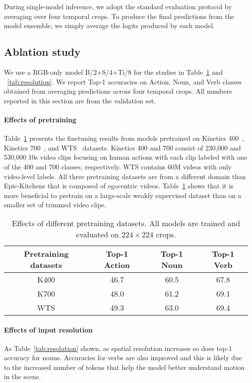 During single-model inference, we adopt the standard evaluation protocol by averaging over four temporal crops. To produce the final predictions from the model ensemble, we simply average the logits produced by each model.

\subsection{Ablation study} 
\label{sec:ablations}
We use a RGB-only model B/2+S/4+Ti/8 for the studies in Table~\ref{tab:pretraining} and ~\ref{tab:resolution}. We report Top-1 accuracies on Action, Noun, and Verb classes obtained from averaging predictions across four temporal crops. All numbers reported in this section are from the validation set.

\paragraph{Effects of pretraining}
Table~\ref{tab:pretraining} presents the finetuning results from models pretrained on Kinetics 400~\cite{kay_arxiv_2017}, Kinetics 700~\cite{kay_arxiv_2017}, and WTS~\cite{stroud2020learning} datasets. Kinetics 400 and 700 consist of 230,000 and 530,000 10s video clips focusing on human actions with each clip labeled with one of the 400 and 700 classes, respectively. WTS contains 60M videos with only video-level labels. All three pretraining datasets are from a different domain than Epic-Kitchens that is composed of egocentric videos. Table~\ref{tab:pretraining} shows that it is more beneficial to pretrain on a large-scale weakly supervised dataset than on a smaller set of trimmed video clips.
\begin{table} 
	\centering
	\scriptsize{
\begin{tabular}{  c  c  c  c }
    \toprule
    Pretraining datasets & Top-1 Action & Top-1 Noun & Top-1 Verb \\
    \midrule
    K400 & 46.7 & 60.5 & 67.8 \\
    K700 & 48.0 & 61.2 & 69.1 \\
    WTS & 49.3 & 63.0 & 69.4 \\
    \bottomrule
   \end{tabular}
   }
	\caption{Effects of different pretraining datasets. All models are trained and evaluated on $224\times224$ crops.}
\label{tab:pretraining}
\end{table}
 
\paragraph{Effects of input resolution}
As Table~\ref{tab:resolution} shown, as spatial resolution increases so does top-1 accuracy for nouns. Accuracies for verbs are also improved and this is likely due to the increased number of tokens that help the model better understand motion in the scene.

